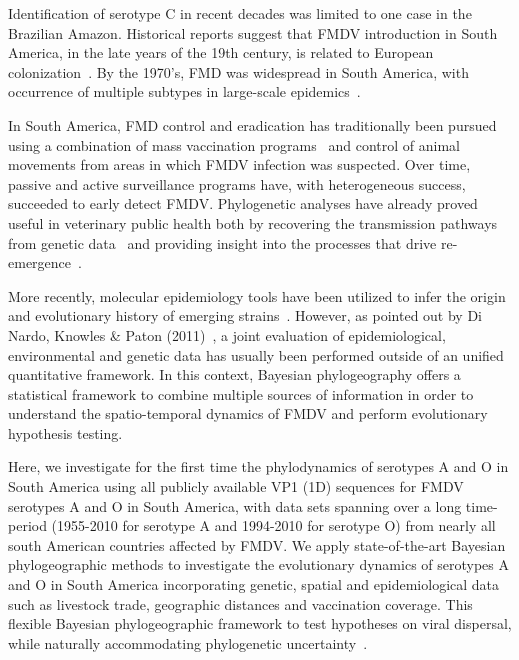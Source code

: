 \documentclass[10pt]{article}
\begin{document}
Identification of serotype C in recent decades was limited to one case in the Brazilian Amazon.
Historical reports suggest that FMDV introduction in South America, in the late years of the 19th century, is  related to European colonization~\cite{tully}. 
By the 1970's, FMD was widespread in South America, with occurrence of multiple subtypes in large-scale epidemics~\cite{Saraiva2003}.



In South America, FMD control and eradication has traditionally been pursued using a combination of mass vaccination programs~\cite{vaccinationSA} and control of animal movements from areas in which FMDV infection was suspected.
Over time, passive and active surveillance programs have, with heterogeneous success, succeeded to early detect FMDV.
Phylogenetic analyses have already proved useful in veterinary public health both by recovering the transmission pathways from genetic data~\cite{cottam2007, cottam2008} and providing insight into the processes that drive re-emergence~\cite{combining}.

More recently, molecular epidemiology tools have been utilized to infer the origin and evolutionary history of emerging strains~\cite{Perez2001, Malirat2007, andean, Malirat2011, Maradei2013}.
However, as pointed out by Di Nardo, Knowles \& Paton (2011)~\cite{combining}, a joint evaluation of epidemiological, environmental and genetic data has usually been performed outside of an unified quantitative framework.
In this context, Bayesian phylogeography offers a statistical framework to combine multiple sources of information in order to understand the spatio-temporal dynamics of FMDV and perform evolutionary hypothesis testing.

Here, we investigate for the first time the phylodynamics of serotypes A and O in South America using all publicly available VP1 (1D) sequences for FMDV serotypes A and O in South America, with data sets spanning over a long time-period (1955-2010 for serotype A and 1994-2010 for serotype O) from nearly all south American countries affected by FMDV.
We apply state-of-the-art Bayesian phylogeographic methods to investigate the evolutionary dynamics of serotypes A and O in South America incorporating  genetic, spatial and epidemiological data such as livestock trade, geographic distances and vaccination coverage.
This flexible Bayesian phylogeographic framework to test hypotheses on viral dispersal, while naturally accommodating phylogenetic uncertainty~\cite{roots, towards}.
\end{document}
